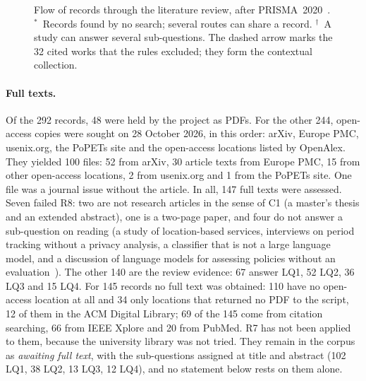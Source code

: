 \begin{figure}[tbp]
\centering
\resizebox{\textwidth}{!}{}
\caption[Flow of records through the literature review]{Flow of records
through the literature review, after PRISMA~2020~\parencite{page2021prisma}.
$^{*}$~Records found by no search; several routes can share a record.
$^{\dagger}$~A study can answer several sub-questions. The dashed arrow marks
the 32 cited works that the rules excluded; they form the contextual
collection.}
\label{fig:lit-flow}
\end{figure}

\paragraph{Full texts.} Of the 292 records, 48 were held by the project as
PDFs. For the other 244, open-access copies were sought on 28 October 2026, in
this order: arXiv, Europe PMC, usenix.org, the PoPETs site and the open-access
locations listed by OpenAlex. They yielded 100 files: 52 from arXiv, 30 article
texts from Europe PMC, 15 from other open-access locations, 2 from usenix.org
and 1 from the PoPETs site. One file was a journal issue without the article.
In all, 147 full texts were assessed. Seven failed R8: two are not research
articles in the sense of C1 (a master's thesis and an extended abstract), one
is a two-page paper, and four do not answer a sub-question on reading (a study
of location-based services, interviews on period tracking without a privacy
analysis, a classifier that is not a large language model, and a discussion of
language models for assessing policies without an
evaluation~\parencite{aydin2024assessing}). The other 140 are the review
evidence: 67 answer LQ1, 52 LQ2, 36 LQ3 and 15 LQ4. For 145 records no full text
was obtained: 110 have no open-access location at all and 34 only locations
that returned no PDF to the script, 12 of them in the ACM Digital Library; 69 of
the 145 come from citation searching, 66 from IEEE Xplore and 20 from PubMed.
R7 has not been applied to them, because the university library was not tried.
They remain in the corpus as \emph{awaiting full text}, with the sub-questions
assigned at title and abstract (102 LQ1, 38 LQ2, 13 LQ3, 12 LQ4), and no
statement below rests on them alone.


